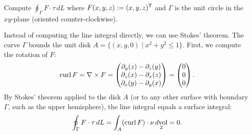 \begin{example}
\label{ex:stokes_path_integral}
Compute $\oint_\Gamma F \cdot \tau \,dL$ where $F(x,y,z) := (x, y, z)^{\mathsf{T}}$ and $\Gamma$ is the unit circle in the $xy$-plane (oriented counter-clockwise).

Instead of computing the line integral directly, we can use Stokes' theorem. The curve $\Gamma$ bounds the unit disk $A = \{(x,y,0) \mid x^2+y^2 \leq 1\}$.
First, we compute the rotation of $F$:
\[\operatorname{curl} F = \nabla \times F = \begin{pmatrix} \partial_y(z) - \partial_z(y) \\ \partial_z(x) - \partial_x(z) \\ \partial_x(y) - \partial_y(x) \end{pmatrix} = \begin{pmatrix} 0 \\ 0 \\ 0 \end{pmatrix}.\]
By Stokes' theorem applied to the disk $A$ (or to any other surface with boundary $\Gamma$, such
as the upper hemisphere), the line integral equals a surface integral:
\[\oint_\Gamma F \cdot \tau \,dL = \int_A (\operatorname{curl} F) \cdot \nu \mathop{d\text{vol}}_2 = 0.\]
\end{example}
